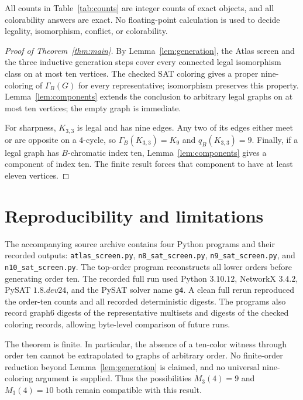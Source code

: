 \documentclass[11pt]{article}
\newcommand{\GB}{\Gamma_{B}}
\newcommand{\qB}{q_{B}}
\begin{document}
All counts in Table~\ref{tab:counts} are integer counts of exact objects, and
all colorability answers are exact.  No floating-point calculation is used
to decide legality, isomorphism, conflict, or colorability.

\begin{proof}[Proof of Theorem~\ref{thm:main}]
By Lemma~\ref{lem:generation}, the Atlas screen and the three inductive
generation steps cover every connected legal isomorphism class on at most ten
vertices.  The checked SAT coloring gives a proper nine-coloring of
$\GB(G)$ for every representative; isomorphism preserves this property.
Lemma~\ref{lem:components} extends the conclusion to arbitrary legal graphs
on at most ten vertices; the empty graph is immediate.

For sharpness, $K_{3,3}$ is legal and has nine edges.  Any two of its edges
either meet or are opposite on a $4$-cycle, so $\GB(K_{3,3})=K_9$ and
$\qB(K_{3,3})=9$.  Finally, if a legal graph has $B$-chromatic index ten,
Lemma~\ref{lem:components} gives a component of index ten.  The finite result
forces that component to have at least eleven vertices.
\end{proof}

\section{Reproducibility and limitations}

The accompanying source archive contains four Python programs and their
recorded outputs: \texttt{atlas\_screen.py},
\texttt{n8\_sat\_screen.py}, \texttt{n9\_sat\_screen.py}, and
\texttt{n10\_sat\_screen.py}.  The top-order program reconstructs all lower
orders before generating order ten.  The recorded full run used Python
$3.10.12$, NetworkX $3.4.2$, PySAT $1.8.dev24$, and the PySAT solver name
\texttt{g4}.  A clean full rerun reproduced the order-ten counts and all
recorded deterministic digests.  The programs also record graph6 digests of
the representative multisets and digests of the checked coloring records,
allowing byte-level comparison of future runs.

The theorem is finite.  In particular, the absence of a ten-color witness
through order ten cannot be extrapolated to graphs of arbitrary order.  No
finite-order reduction beyond Lemma~\ref{lem:generation} is claimed, and no
universal nine-coloring argument is supplied.  Thus the possibilities
$M_3(4)=9$ and $M_3(4)=10$ both remain compatible with this result.
\end{document}

